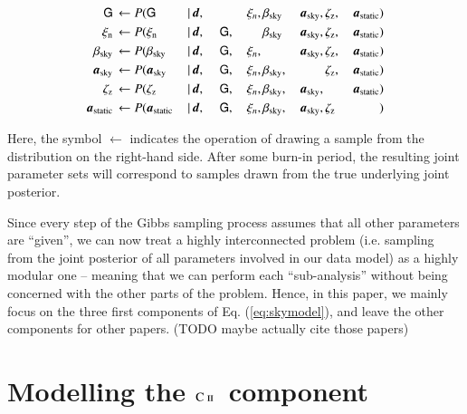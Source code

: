\documentclass{aa}
\newcommand{\mathsc}[1]{{\normalfont\textsc{#1}}}
\newcommand{\G}[0]{\tens{G}}
\renewcommand{\a}[0]{\vec{a}}
\newcommand{\dv}[0]{\vec{d}}
\newcommand{\cii}{\ensuremath{\mathsc {C\ ii}}}
\begin{document}
\begin{equation}
    \label{eq:gibbschain}
\begin{aligned}
\G &\,\leftarrow P(\G&\,\mid &\,\dv,&\, &\,\phantom{\G} &\,\xi_n, &
\,\beta_{\mathrm{sky}}& \,\a_{\mathrm{sky}}, &\,\zeta_{\mathrm{z}},
&\,\a_{\mathrm{static}})\\
\xi_{\mathrm{n}} &\,\leftarrow P(\xi_{\mathrm{n}}&\,\mid &\,\dv,&\, &\,\G, &\,\phantom{\xi_n} &
\,\beta_{\mathrm{sky}}& \,\a_{\mathrm{sky}}, &\,\zeta_{\mathrm{z}},
&\,\a_{\mathrm{static}})\\
\beta_{\mathrm{sky}} &\,\leftarrow P(\beta_{\mathrm{sky}}&\,\mid &\,\dv,&\, &\,\G, &\,\xi_n, &
\,\phantom{\beta_{\mathrm{sky}}}& \,\a_{\mathrm{sky}}, &\,\zeta_{\mathrm{z}}, &\,\a_{\mathrm{static}})\\
\a_{\mathrm{sky}} &\,\leftarrow P(\a_{\mathrm{sky}}&\,\mid &\,\dv,&\, &\,\G, &\,\xi_n, &
\,\beta_{\mathrm{sky}},& \,\phantom{\a_{\mathrm{sky}},}
&\,\zeta_{\mathrm{z}}, &\,\a_{\mathrm{static}})\\
\zeta_{\mathrm{z}} &\,\leftarrow P(\zeta_{\mathrm{z}}&\,\mid &\,\dv,&\, &\,\G, &\,\xi_n, &
\,\beta_{\mathrm{sky}},& \,\a_{\mathrm{sky}},
&\,\phantom{\zeta_{\mathrm{z}},} &\,\a_{\mathrm{static}})\\
\a_{\mathrm{static}} &\,\leftarrow P(\a_{\mathrm{static}}&\,\mid &\,\dv,&\, &\,\G, &\,\xi_n, &
\,\beta_{\mathrm{sky}},& \,\a_{\mathrm{sky}}, &\,\zeta_{\mathrm{z}} &\,\phantom{\a_{\mathrm{static}}})
\end{aligned}
\end{equation}

Here, the symbol $\leftarrow$ indicates the operation of drawing a sample from
the distribution on the right-hand side. After some burn-in period, the
resulting joint parameter sets will correspond to samples drawn from the true
underlying joint posterior.

Since every step of the Gibbs sampling process assumes that all other
parameters are ``given'', we can now treat a highly interconnected problem
(i.e. sampling from the joint posterior of all parameters involved in our data
model) as a highly modular one -- meaning that we can perform each
``sub-analysis'' without being concerned with the other parts of the problem.
Hence, in this paper, we mainly focus on the three first components of Eq.
(\ref{eq:skymodel}), and leave the other components for other papers. (TODO
maybe actually cite those papers)


\clearpage
\section{Modelling the \cii\ component}
\end{document}
